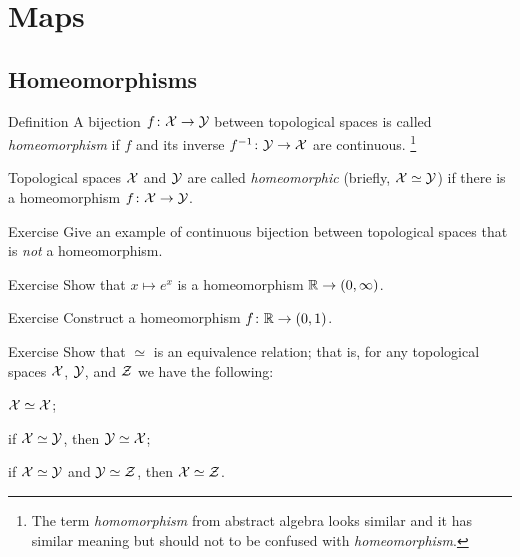 \chapter{Maps}



\section{Homeomorphisms}

\begin{thm}{Definition}\label{def:homeo}
A bijection $f\colon\mathcal{X}\to\mathcal{Y}$ between topological spaces 
is called \emph{homeomorphism} if $f$ and its inverse $f^{-1}\colon\mathcal{Y}\to\mathcal{X}$
are continuous.%
\footnote{The term \emph{homomorphism} from abstract algebra looks similar and it has similar meaning but should not to be confused with \emph{homeomorphism}.}

Topological spaces $\mathcal{X}$ and $\mathcal{Y}$ are called \emph{homeomorphic} (briefly, $\mathcal{X}\simeq\mathcal{Y}$) if there is a homeomorphism $f\colon\mathcal{X}\to\mathcal{Y}$.
\end{thm}


\begin{thm}{Exercise}
Give an example of continuous bijection between topological spaces that is \emph{not} a homeomorphism.
\end{thm}

\begin{thm}{Exercise}
Show that $x\mapsto e^x$ is a homeomorphism $\mathbb{R}\to (0,\infty)$.
\end{thm}

\begin{thm}{Exercise}
Construct a homeomorphism $f\colon\mathbb{R}\to (0,1)$.
\end{thm}

\begin{thm}{Exercise}
Show that $\simeq$ is an equivalence relation;
that is, for any topological spaces $\mathcal{X}$, $\mathcal{Y}$, and $\mathcal{Z}$ we have the following:
\begin{subthm}{}
$\mathcal{X}\simeq\mathcal{X}$;
\end{subthm}

\begin{subthm}{}
if $\mathcal{X}\simeq\mathcal{Y}$, then $\mathcal{Y}\simeq\mathcal{X}$;
\end{subthm}

\begin{subthm}{}
if $\mathcal{X}\simeq\mathcal{Y}$ and $\mathcal{Y}\simeq\mathcal{Z}$, then $\mathcal{X}\simeq\mathcal{Z}$.
\end{subthm}

\end{thm}

